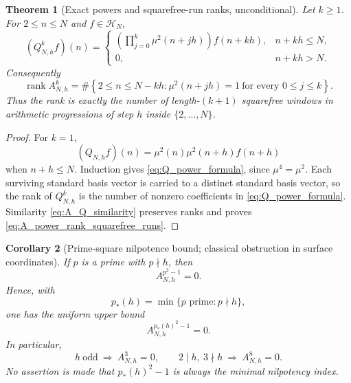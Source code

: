 \documentclass[11pt]{amsart}
\numberwithin{equation}{section}
\theoremstyle{plain}
\newtheorem{theorem}{Theorem}[section]
\newtheorem{corollary}[theorem]{Corollary}
\theoremstyle{definition}
\theoremstyle{remark}
\newcommand{\mob}{\mu}
\DeclareMathOperator{\rank}{rank}
\begin{document}
\begin{theorem}[Exact powers and squarefree-run ranks, unconditional]
\label{thm:squarefree_power_rank}
Let $k\ge1$.  For $2\le n\le N$ and $f\in\mathcal H_N$,
\begin{equation}
(Q_{N,h}^kf)(n)=
\begin{cases}
\displaystyle
\left(\prod_{j=0}^{k}\mob^2(n+jh)\right)f(n+kh),&n+kh\le N,\\[1ex]
0,&n+kh>N.
\end{cases}
\label{eq:Q_power_formula}
\end{equation}
Consequently
\begin{equation}
\rank A_{N,h}^k
=\#\left\{2\le n\le N-kh:
\mob^2(n+jh)=1\ \text{for every }0\le j\le k\right\}.
\label{eq:A_power_rank_squarefree_runs}
\end{equation}
Thus the rank is exactly the number of length-$(k+1)$ squarefree windows in arithmetic progressions of step $h$ inside $\{2,\ldots,N\}$.
\end{theorem}

\begin{proof}
For $k=1$,
\begin{equation}
(Q_{N,h}f)(n)=\mob^2(n)\mob^2(n+h)f(n+h)
\label{eq:Q_first_power}
\end{equation}
when $n+h\le N$.  Induction gives \eqref{eq:Q_power_formula}, since $\mob^4=\mob^2$.  Each surviving standard basis vector is carried to a distinct standard basis vector, so the rank of $Q_{N,h}^k$ is the number of nonzero coefficients in \eqref{eq:Q_power_formula}.  Similarity \eqref{eq:A_Q_similarity} preserves ranks and proves \eqref{eq:A_power_rank_squarefree_runs}.
\end{proof}

\begin{corollary}[Prime-square nilpotence bound; classical obstruction in surface coordinates]
\label{cor:prime_square_nilpotence}
If $p$ is a prime with $p\nmid h$, then
\begin{equation}
A_{N,h}^{p^2-1}=0.
\label{eq:prime_square_nilpotence}
\end{equation}
Hence, with
\begin{equation}
p_*(h)=\min\{p\text{ prime}:p\nmid h\},
\label{eq:p_star_definition}
\end{equation}
one has the uniform upper bound
\begin{equation}
A_{N,h}^{p_*(h)^2-1}=0.
\label{eq:p_star_nilpotence}
\end{equation}
In particular,
\begin{equation}
h\ \text{odd}\ \Longrightarrow\ A_{N,h}^3=0,
\qquad
2\mid h,\ 3\nmid h\ \Longrightarrow\ A_{N,h}^8=0.
\label{eq:small_prime_nilpotence}
\end{equation}
No assertion is made that $p_*(h)^2-1$ is always the minimal nilpotency index.
\end{corollary}
\end{document}

